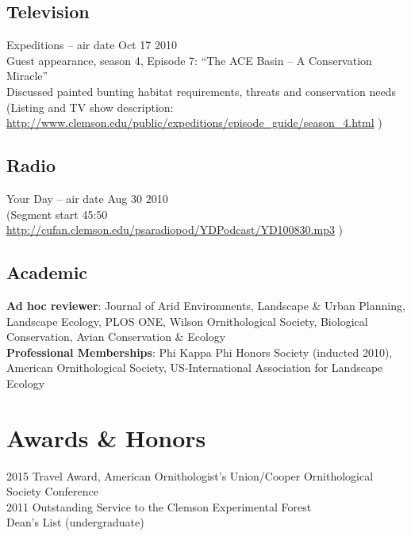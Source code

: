 \documentclass[11pt,a4paper,]{awesome-cv}
\begin{document}
\subsection{Television}\label{television}

Expeditions -- air date Oct 17 2010\\
Guest appearance, season 4, Episode 7: ``The ACE Basin -- A Conservation
Miracle''\\
Discussed painted bunting habitat requirements, threats and conservation
needs\\
(Listing and TV show description:\\
\url{http://www.clemson.edu/public/expeditions/episode_guide/season_4.html}
)

\subsection{Radio}\label{radio}

Your Day -- air date Aug 30 2010\\
(Segment start 45:50
\url{http://cufan.clemson.edu/psaradiopod/YDPodcast/YD100830.mp3} )

\subsection{Academic}\label{academic}

\textbf{Ad hoc reviewer}: Journal of Arid Environments, Landscape \&
Urban Planning, Landscape Ecology, PLOS ONE, Wilson Ornithological
Society, Biological Conservation, Avian Conservation \& Ecology\\
\textbf{Professional Memberships}: Phi Kappa Phi Honors Society
(inducted 2010), American Ornithological Society, US-International
Association for Landscape Ecology

\section{Awards \& Honors}\label{awards-honors}

2015 Travel Award, American Ornithologist's Union/Cooper Ornithological
Society Conference\\
2011 Outstanding Service to the Clemson Experimental Forest\\
Dean's List (undergraduate)
\end{document}
